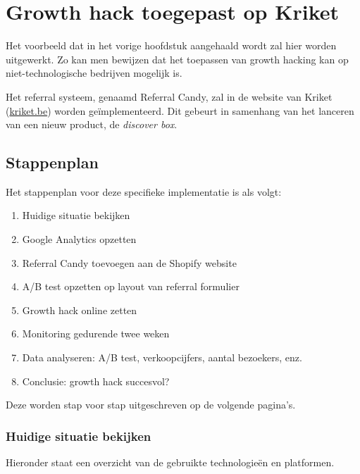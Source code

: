 
\chapter{Growth hack toegepast op Kriket}
\label{ch:implementatie}

Het voorbeeld dat in het vorige hoofdstuk aangehaald wordt zal hier worden uitgewerkt. Zo kan men bewijzen dat het toepassen van growth hacking kan op niet-technologische bedrijven mogelijk is. 

Het referral systeem, genaamd Referral Candy, zal in de website van Kriket (\href{https://kriket.be}{kriket.be}) worden geïmplementeerd. Dit gebeurt in samenhang van het lanceren van een nieuw product, de \emph{discover box}.

\section{Stappenplan}
\label{sec:implementatie-stappenplan}

Het stappenplan voor deze specifieke implementatie is als volgt:

\begin{enumerate}
	\item Huidige situatie bekijken
	\item Google Analytics opzetten
	\item Referral Candy toevoegen aan de Shopify website
	\item A/B test opzetten op layout van referral formulier
	\item Growth hack online zetten
	\item Monitoring gedurende twee weken
	\item Data analyseren: A/B test, verkoopcijfers, aantal bezoekers, enz.
	\item Conclusie: growth hack succesvol?
\end{enumerate}

Deze worden stap voor stap uitgeschreven op de volgende pagina's. 

\subsection{Huidige situatie bekijken} \label{sec:huidige-situatie-analyseren}

Hieronder staat een overzicht van de gebruikte technologieën en platformen.

